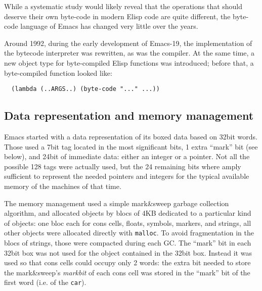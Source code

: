 \documentclass[format=acmsmall, review=false, screen=true]{acmart}
\newcommand \Elisp {Elisp}
\begin{document}
While a systematic study would likely reveal that the operations that should
deserve their own byte-code in modern \Elisp{} code are quite different, the
byte-code language of Emacs has changed very little over the years.

Around 1992, during the early development of Emacs-19, the implementation of
the bytecode interpreter was rewritten, as was the compiler.  At the same
time, a new object type for byte-compiled \Elisp{} functions was introduced;
before that, a byte-compiled function looked like:
\begin{verbatim}
  (lambda (..ARGS..) (byte-code "..." ...))
\end{verbatim}


\subsection{Data representation and memory management}
\label{sec:data-representation}

Emacs started with a data representation of its boxed data based on 32bit
words.  Those used a 7bit tag located in the most significant bits, 1 extra
``mark'' bit (see below), and 24bit of immediate data: either an integer or
a pointer.  Not all the possible 128 tags were actually used, but the 24
remaining bits where amply sufficient to represent the needed pointers and
integers for the typical available memory of the machines of that time.

The memory management used a simple mark\&sweep garbage collection
algorithm, and allocated objects by blocs of 4KB dedicated to a particular
kind of objects: one bloc each for cons cells, floats, symbols, markers, and
strings, all other objects were allocated directly with \texttt{malloc}.
To avoid fragmentation in the blocs of strings, those were compacted during
each GC.  The ``mark'' bit in each 32bit box was not used for the object
contained in the 32bit box.  Instead it was used so that cons cells could
occupy only 2 words: the extra bit needed to store the mark\&sweep's
\emph{markbit} of each cons cell was stored in the ``mark'' bit of the first
word (i.e. of the \texttt{car}).

\end{document}
